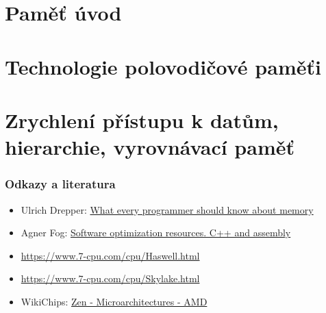 \documentclass{beamer}
\begin{document}
\section{Paměť úvod}



\section{Technologie polovodičové paměťi}







\section{Zrychlení přístupu k datům, hierarchie, vyrovnávací paměť}









\begin{frame}
\frametitle{Odkazy a literatura}

\begin{itemize}
\item Ulrich Drepper: \href{https://lwn.net/Articles/250967/}{What every programmer should know about memory}
\item Agner Fog: \href{https://www.agner.org/optimize/}{Software optimization resources. C++ and assembly}
\item \url{https://www.7-cpu.com/cpu/Haswell.html}
\item \url{https://www.7-cpu.com/cpu/Skylake.html}
\item WikiChips: \href{https://en.wikichip.org/wiki/amd/microarchitectures/zen}{Zen - Microarchitectures - AMD}

\end{itemize}

\end{frame}
\end{document}
